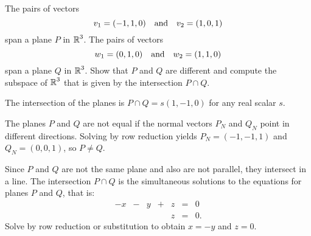 \documentclass{ximera}
\begin{document}
\begin{exercise} \label{c5.7.2}
The pairs of vectors
\[
     v_1=(-1,1,0) \quad\mbox{and}\quad v_2=(1,0,1)
\]
span a plane $P$ in $\mbox{$\Bbb{R}$}^3$.  The pairs of vectors
\[
        w_1=(0,1,0) \quad\mbox{and}\quad w_2=(1,1,0)
\]
span a plane $Q$ in $\mbox{$\Bbb{R}$}^3$.  Show that $P$ and $Q$
are different and compute the subspace of $\mbox{$\Bbb{R}$}^3$ that
is given by the intersection $P\cap Q$.

\begin{solution}

\ans The intersection of the planes is $P \cap Q = s(1,-1,0)$ for any
real scalar $s$.

\soln The planes $P$ and $Q$ are not equal if the normal vectors $P_N$
and $Q_N$ point in different directions.  Solving by row reduction
yields $P_N = (-1,-1,1)$ and $Q_N = (0,0,1)$, so $P \neq Q$.

\para Since $P$ and $Q$ are not the same plane and also are not
parallel, they intersect in a line.  The intersection $P \cap Q$ is
the simultaneous solutions to the equations for planes $P$ and $Q$,
that is:
\[ \begin{array}{rrrrrrl}
-x & - & y & + & z & = & 0 \\
& & & & z & = & 0. \end{array} \]
Solve by row reduction or substitution to obtain $x = -y$ and $z = 0$.

\end{solution}
\end{exercise}
\end{document}
